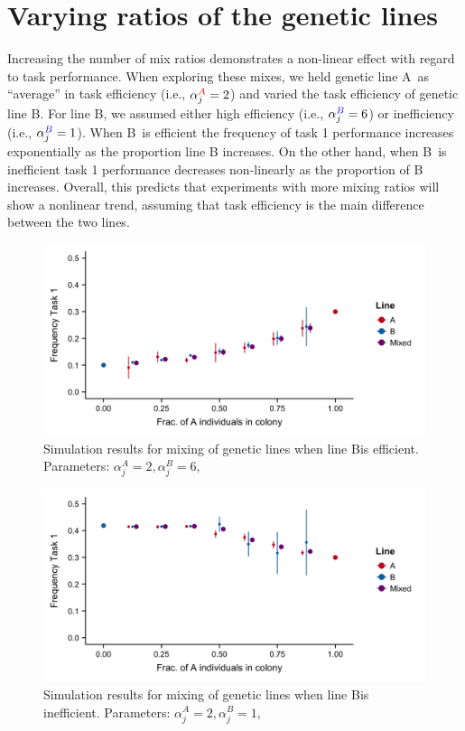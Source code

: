 \documentclass[11pt]{article}
\newcommand{\A}{{\color{red}A}}
\newcommand{\B}{{\color{blue}B}}
\begin{document}
\section{Varying ratios of the genetic lines} \label{sec:varyratios}
Increasing the number of mix ratios demonstrates a non-linear effect with regard to task performance. When exploring these mixes, we held genetic line \A\ as ``average'' in task efficiency (i.e., $\alpha_j^{\A} = 2$) and varied the task efficiency of genetic line \B. For line \B, we assumed either high efficiency (i.e., $\alpha_j^{\B} = 6$) or inefficiency (i.e., $\alpha_j^{\B} = 1$). When \B\ is efficient the frequency of task 1 performance increases exponentially as the proportion line B increases. On the other hand, when \B\ is inefficient task 1 performance decreases non-linearly as the proportion of B increases. Overall, this predicts that experiments with more mixing ratios will show a nonlinear trend, assuming that task efficiency is the main difference between the two lines. 

\begin{figure}[H]
    \centering
    \includegraphics[trim={0 0.25in 0 0.2in}, clip, width=0.9\linewidth]{doc/Mix_Alphas_B-super-efficient_Means.png}
    \caption{Simulation results for mixing of genetic lines when line \B is efficient. Parameters: $\alpha_j^A = 2, \alpha_j^B = 6,$}
    \label{fig:Mix_Alphas_B-efficient}
\end{figure}

\begin{figure}[H]
    \centering
    \includegraphics[trim={0 0.25in 0 0.2in}, clip, width=0.9\linewidth]{doc/Mix_Alphas_B-inefficient_Means.png}
    \caption{Simulation results for mixing of genetic lines when line \B is inefficient. Parameters: $\alpha_j^A = 2, \alpha_j^B = 1,$}
    \label{fig:Mix_Alphas_B-inefficient}
\end{figure}
\end{document}
